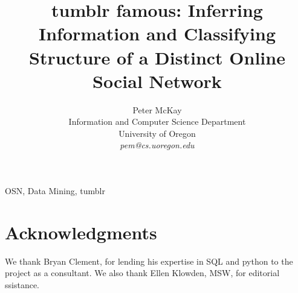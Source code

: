 \documentclass[10pt,twocolumn]{IEEEtran11}
\begin{document}
%


\title{\Large \bf tumblr famous: Inferring Information and Classifying Structure of a Distinct Online Social Network
}
\author{
Peter McKay\\
Information and Computer Science Department\\
University of Oregon\\
{\em pem@cs.uoregon.edu}
}
\maketitle


\begin{keywords} 
OSN, Data Mining, tumblr
\end{keywords}









\section{Acknowledgments}
We thank Bryan Clement, for lending his expertise in SQL and python to 
the project as a consultant. We also thank Ellen Klowden, MSW, for 
editorial ssistance.


\end{document}

